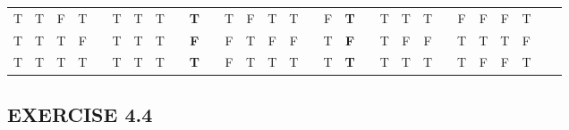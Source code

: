 \documentclass[a4paper,12pt]{article}
\begin{document}
\begin{enumerate}[label=\arabic*,leftmargin=*]
\begin{enumerate}[label=\arabic*.]
\begin{minipage}{\textwidth}
{\begin{tabular}{c c c c | c c c c c c c c c c c c | c c c c c c c c c c c c c}
                        T & T & F & T &   & T & T & T &   & \textbf{T} &   & T  & F & T & T &   & F & \textbf{T} &   & T & T    & T  &   & F & F  & F  & T &   &  \\
                        T & T & T & F &   & T & T & T &   & \textbf{F} &   & F  & T & F & F &   & T & \textbf{F} &   & T & F    & F  &   & T & T  & T  & F &   &  \\
                        T & T & T & T &   & T & T & T &   & \textbf{T} &   & F  & T & T & T &   & T & \textbf{T} &   & T & T    & T  &   & T & F  & F  & T &   &  \\
                    \end{tabular}
                    }
                    \vspace{1em}
                \end{minipage}

            \end{enumerate}

    \end{enumerate}

    \subsection*{EXERCISE 4.4}
\end{document}
